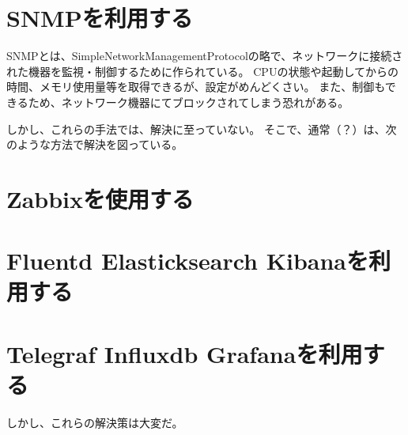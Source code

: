 \begin{comment}
NAPTとは、NetworkAddressPortTranslationの略で、外部のネットワークと内部のネットワークを分離する機能を持つ。
そのため、デバイス管理者から送信された
具体的には、内側から外側へデータを送信する際、送信元IPアドレスとポート番号を機器のIPアドレスとポート番号に変換・記憶し、
外部から内部へデータの送信があった場合、記憶していたIPアドレスとポート番号から、送信先IPアドレスとポートを書き換え、内部へ転送する
そのため、内側から始る通信は問題ないが、外側から始まる通信はブロックしてしまう。
\end{comment}

\section{SNMPを利用する}
SNMPとは、SimpleNetworkManagementProtocolの略で、ネットワークに接続された機器を監視・制御するために作られている。
CPUの状態や起動してからの時間、メモリ使用量等を取得できるが、設定がめんどくさい。
また、制御もできるため、ネットワーク機器にてブロックされてしまう恐れがある。


しかし、これらの手法では、解決に至っていない。
そこで、通常（？）は、次のような方法で解決を図っている。
\section{Zabbixを使用する}

\section{Fluentd Elasticksearch Kibanaを利用する}
\section{Telegraf Influxdb Grafanaを利用する}
しかし、これらの解決策は大変だ。


